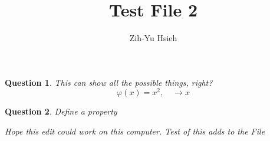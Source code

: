 \documentclass{article}
\title{Test File 2}
\author{Zih-Yu Hsieh}
\newtheorem{question}{Question}
\begin{document}
\maketitle

\begin{question}
    This can show all the possible things, right? 
    $$\varphi(x) = x^2,\quad \rightarrow x$$
\end{question}

\begin{question}
    Define a property

    Hope this edit could work on this computer.
    Test of this adds to the File
\end{question}
\end{document}
